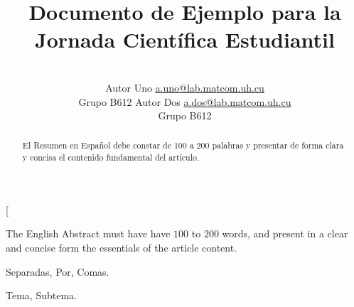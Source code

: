 \documentclass[a4paper,10pt,twocolumn]{article}
\title{Documento de Ejemplo para la Jornada Científica Estudiantil}
\author{\\
\name Autor Uno \email \href{mailto:a.uno@lab.matcom.uh.cu}{a.uno@lab.matcom.uh.cu}
	\\ \addr Grupo B612 \AND
\name Autor Dos \email \href{mailto:a.dos@lab.matcom.uh.cu}{a.dos@lab.matcom.uh.cu}
  \\ \addr Grupo B612}
\begin{document}
\twocolumn[

\maketitle


\begin{abstract}

	El Resumen en Español debe constar de $100$ a $200$ palabras y presentar de forma
	clara y concisa el contenido fundamental del artículo.

\end{abstract}

\vspace{0.5cm}

\begin{enabstract}

  The English Abstract must have have $100$ to $200$ words, and present in a clear
  and concise form the essentials of the article content.

\end{enabstract}

\begin{keywords}
	Separadas,
	Por,
	Comas.
\end{keywords}

\begin{topics}
	Tema, Subtema.
\end{topics}
\end{document}

